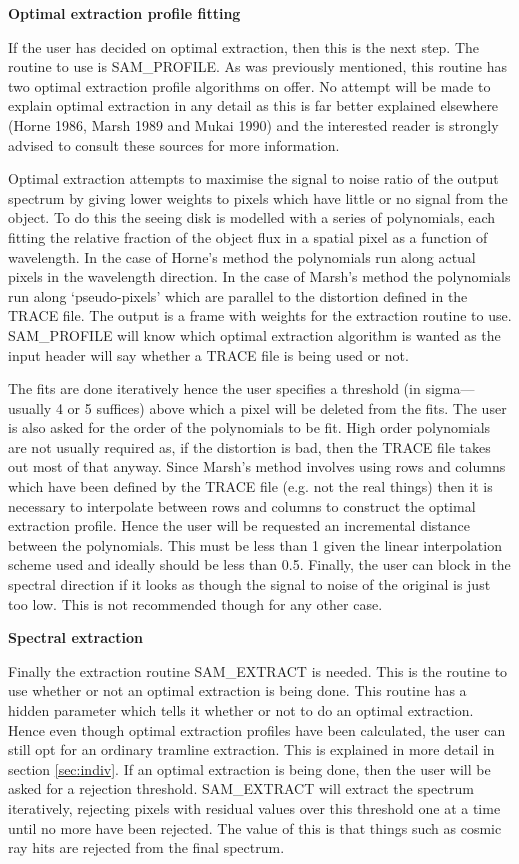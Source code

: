 {\bf Optimal extraction profile fitting}

If the user has decided on optimal extraction, then this is the next step. The
routine to use is SAM\_PROFILE.  As was previously mentioned, this  routine
has two optimal extraction profile algorithms on offer.  No attempt will be
made to explain optimal extraction in any detail as this is far  better
explained elsewhere (Horne 1986, Marsh 1989 and Mukai 1990) and  the
interested  reader is strongly advised to consult these sources for more
information.

Optimal extraction attempts to maximise the signal to noise ratio of the
output spectrum by giving lower weights to pixels which have little or no
signal from the object.  To do this the seeing disk is modelled with a series
of polynomials, each fitting the relative fraction of the object flux in  a
spatial pixel as a function of wavelength. In the case of Horne's method the
polynomials  run along actual pixels in the wavelength direction. In the case
of Marsh's method the polynomials run along `pseudo-pixels' which are parallel
to the distortion defined in the TRACE file.   The output is a frame with
weights for the extraction routine to use.  SAM\_PROFILE will know which
optimal extraction algorithm is wanted as the input header will say whether a
TRACE file is being used or not.

The fits are done iteratively hence the user specifies a threshold (in
sigma---usually 4 or 5 suffices) above which a pixel will be deleted from the
fits.  The user is also asked for the order of the polynomials to be fit.
High order polynomials are not usually required as, if the distortion is bad,
then the TRACE file takes out most of that anyway. Since Marsh's method
involves using rows and columns which have been defined by the TRACE file
(e.g. not the real things) then it is necessary to interpolate between rows
and columns to construct the optimal extraction profile.  Hence the user will
be requested an incremental distance between the polynomials.  This must be
less than 1 given the linear interpolation scheme used and ideally should be
less than 0.5.  Finally, the user can block in the spectral direction if it
looks as though the signal to noise of the original is just too low.  This is
not recommended though for any other case.

{\bf Spectral extraction}

Finally the extraction routine SAM\_EXTRACT is needed.  This is the routine to
use whether or not an optimal extraction is being done.  This routine has a
hidden parameter which tells it whether or not to do an optimal extraction.
Hence even though optimal extraction profiles have been calculated, the user
can still opt for an ordinary tramline extraction.  This is explained in more
detail in section \ref{sec:indiv}.  If an optimal extraction is being done,
then the user will be asked for a rejection threshold.  SAM\_EXTRACT will
extract the spectrum iteratively, rejecting pixels with residual values over
this threshold one at a time until no more have been rejected.  The value of
this is that things such as cosmic ray hits are rejected from the final
spectrum.

